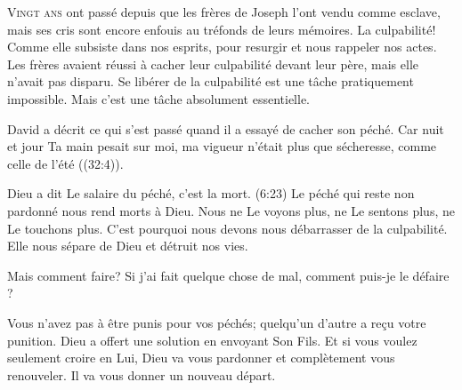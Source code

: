 \dvrule







\lettrine{V}{ingt ans} ont passé depuis que les frères de Joseph
 l'ont vendu comme esclave, mais ses cris sont encore enfouis
 au tréfonds de leurs mémoires. La culpabilité!
 Comme elle subsiste dans nos esprits, pour resurgir
 et nous rappeler nos actes.
 Les frères avaient réussi à cacher leur culpabilité devant leur père,
 mais elle n'avait pas disparu.
 Se libérer de la culpabilité est une tâche pratiquement impossible.
 Mais c'est une tâche absolument essentielle. 


David a décrit ce qui s'est passé quand il a essayé de cacher son péché.
 \Og Car nuit et jour Ta main pesait sur moi,
 ma vigueur n'était plus que sécheresse, comme celle de l'été \Fg{}
 ((32:4)). 

Dieu a dit\frcolon{} \Og Le salaire du péché, c'est la mort. \Fg{}
 (6:23)
 Le péché qui reste non pardonné nous rend morts à Dieu.
 Nous ne Le voyons plus, ne Le sentons plus, ne Le touchons plus.
 C'est pourquoi nous devons nous débarrasser de la culpabilité.
 Elle nous sépare de Dieu et détruit nos vies. 

Mais comment faire? Si j'ai fait quelque chose de mal,
 comment puis-je le \Og défaire \Fg{} ? 

Vous n'avez pas à être punis pour vos péchés;
 quelqu'un d'autre a re\c{c}u votre punition.
 Dieu a offert une solution en envoyant Son Fils.
 Et si vous voulez seulement croire en Lui,
 Dieu va vous pardonner et complètement vous renouveler.
 Il va vous donner un nouveau départ.

\dvrule

